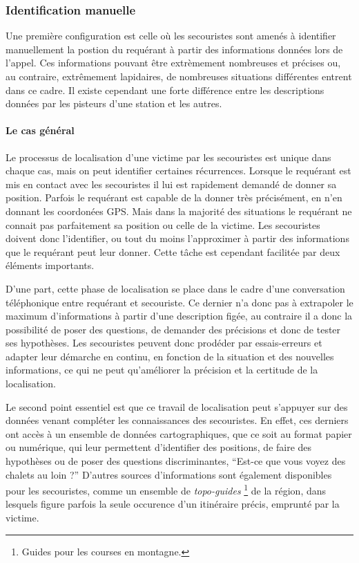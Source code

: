 \subsubsection{Identification manuelle}
\label{subsec:1-1-2-1}

Une première configuration est celle où les secouristes sont amenés à
identifier manuellement la postion du requérant à partir des
informations données lors de l'appel. Ces informations pouvant être
extrèmement nombreuses et précises ou, au contraire, extrêmement
lapidaires, de nombreuses situations différentes entrent dans ce
cadre. Il existe cependant une forte différence entre les descriptions
données par les pisteurs d'une station et les autres.

\paragraph{Le cas général}

Le processus de localisation d'une victime par les secouristes est
unique dans chaque cas, mais on peut identifier certaines
récurrences. Lorsque le requérant est mis en contact avec les
secouristes il lui est rapidement demandé de donner sa
position. Parfois le requérant est capable de la donner très
précisément, \eg en n'en donnant les coordonées GPS. Mais dans la
majorité des situations le requérant ne connait pas parfaitement sa
position ou celle de la victime. Les secouristes doivent donc
l'identifier, ou tout du moins l'approximer à partir des informations
que le requérant peut leur donner. Cette tâche est cependant facilitée
par deux éléments importants.

D'une part, cette phase de localisation se place dans le cadre d'une
conversation téléphonique entre requérant et secouriste. Ce dernier
n'a donc pas à extrapoler le maximum d'informations à partir d'une
description figée, au contraire il a donc la possibilité de poser des
questions, de demander des précisions et donc de tester ses
hypothèses. Les secouristes peuvent donc prodéder par essais-erreurs
et adapter leur démarche en continu, en fonction de la situation et
des nouvelles informations, ce qui ne peut qu'améliorer la précision
et la certitude de la localisation.

Le second point essentiel est que ce travail de localisation peut
s'appuyer sur des données venant compléter les connaissances des
secouristes. En effet, ces derniers ont accès à un ensemble de données
cartographiques, que ce soit au format papier ou numérique, qui leur
permettent d'identifier des positions, de faire des hypothèses ou de
poser des questions discriminantes, \eg \enquote{Est-ce que vous voyez
  des chalets au loin ?} D'autres sources d'informations sont
également disponibles pour les secouristes, comme un ensemble de
\emph{topo-guides} \footnote{Guides pour les courses en montagne.} de
la région, dans lesquels figure parfois la seule occurence d'un
itinéraire précis, emprunté par la victime. 

